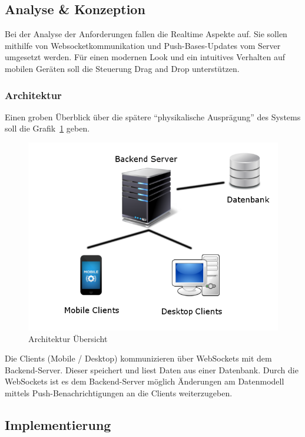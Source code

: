 \documentclass[12pt,a4paper]{scrartcl}
\begin{document}
\subsection{Analyse \& Konzeption}
Bei der Analyse der Anforderungen fallen die Realtime Aspekte auf. Sie sollen mithilfe von Websocketkommunikation und Push-Bases-Updates vom Server umgesetzt werden. Für einen modernen Look und ein intuitives Verhalten auf mobilen Geräten soll die Steuerung Drag and Drop unterstützen.
\subsubsection*{Architektur}
Einen groben Überblick über die spätere ``physikalische Ausprägung'' des Systems soll die Grafik~\ref{fig:architektur} geben.
\begin{figure}[h]
\includegraphics[scale=0.5]{img/Architektur.png}
\caption{Architektur Übersicht\label{fig:architektur}}
\end{figure}
Die Clients (Mobile / Desktop) kommunizieren über WebSockets mit dem Backend-Server. Dieser speichert und liest Daten aus einer Datenbank. Durch die WebSockets ist es dem Backend-Server möglich Änderungen am Datenmodell mittels Push-Benachrichtigungen an die Clients weiterzugeben.
\subsection{Implementierung}
\end{document}
